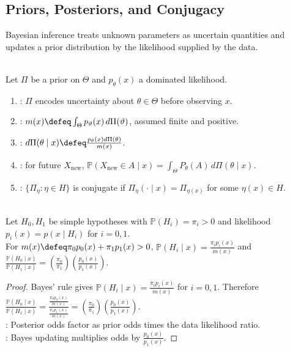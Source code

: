 \subsection{Priors, Posteriors, and Conjugacy}

Bayesian inference treats unknown parameters as uncertain quantities and updates a prior distribution by the likelihood supplied by the data.

\begin{definition} \label{def:prior-posterior-predictive} \label{def:conjugate-prior-family} \\
Let $\Pi$ be a prior on $\Theta$ and $p_\theta(x)$ a dominated likelihood.
\begin{enumerate}[label=(\roman*)]
\setlength{\itemsep}{0pt}
\item {}: $\Pi$ encodes uncertainty about $\theta\in\Theta$ before observing $x$.
\item {}: $m(x)\defeq\int_\Theta p_\vartheta(x)\,d\Pi(\vartheta)$, assumed finite and positive.
\item {}: $d\Pi(\theta\mid x)\defeq \frac{p_\theta(x)d\Pi(\theta)}{m(x)}$.
\item {}: for future $X_{\mathrm{new}}$, $\mathbb{P}(X_{\mathrm{new}}\in A\mid x)=\int_\Theta P_\theta(A)\,d\Pi(\theta\mid x)$.
\item {}: $\{\Pi_\eta:\eta\in H\}$ is conjugate if $\Pi_\eta(\cdot\mid x)=\Pi_{\eta(x)}$ for some $\eta(x)\in H$.
\end{enumerate}
\end{definition}

\begin{proposition} \label{prop:posterior-odds-likelihood-ratio} \\
Let $H_0,H_1$ be simple hypotheses with $\mathbb{P}(H_i)=\pi_i>0$ and likelihood $p_i(x)=p(x\mid H_i)$ for $i=0,1$.\\
For $m(x)\defeq\pi_0p_0(x)+\pi_1p_1(x)>0$, $\mathbb{P}(H_i\mid x)=\frac{\pi_ip_i(x)}{m(x)}$ and $\frac{\mathbb{P}(H_0\mid x)}{\mathbb{P}(H_1\mid x)}=(\frac{\pi_0}{\pi_1})(\frac{p_0(x)}{p_1(x)})$.
\begin{proof}
Bayes' rule gives $\mathbb{P}(H_i\mid x)=\frac{\pi_ip_i(x)}{m(x)}$ for $i=0,1$. Therefore $\frac{\mathbb{P}(H_0\mid x)}{\mathbb{P}(H_1\mid x)}=\frac{\frac{\pi_0p_0(x)}{m(x)}}{\frac{\pi_1p_1(x)}{m(x)}}=(\frac{\pi_0}{\pi_1})(\frac{p_0(x)}{p_1(x)})$.\\
: Posterior odds factor as prior odds times the data likelihood ratio.\\
: Bayes updating multiplies odds by $\frac{p_0(x)}{p_1(x)}$.
\end{proof}
\end{proposition}

